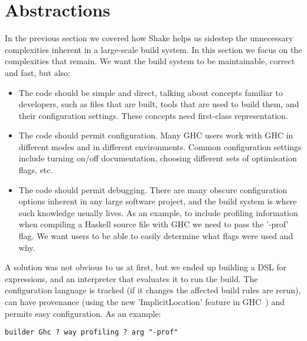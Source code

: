 \section{Abstractions\label{sec:abstractions}}


In the previous section we covered how Shake helps us sidestep the unnecessary
complexities inherent in a large-scale build system. In this section we focus on
the complexities that remain. We want the build system to be maintainable, correct
and fast, but also:

\begin{itemize}
\item The code should be simple and direct, talking about concepts familiar to
developers, such as files that are built, tools that are used to build
them, and their configuration settings. These concepts need first-class
representation.
\item The code should permit configuration. Many GHC users work with GHC in
different modes and in different environments. Common configuration settings
include turning on/off documentation, choosing different sets of optimisation flags,
etc.
\item The code should permit debugging. There are many obscure configuration
options inherent in any large software project, and the build system is where
such knowledge usually lives. As an example, to include profiling information
when compiling a Haskell source file with GHC we need to pass the \lst'-prof' flag.
We want users to be able to easily determine what flags were used and why.
\end{itemize}

A solution was not obvious to us at first, but we ended up building a DSL for
expressions, and an interpreter that evaluates it to run the build.
The configuration language is tracked (if it changes the affected build rules
are rerun), can have provenance (using the new \lst'ImplicitLocation' feature in
GHC~) and permits easy configuration. As an example:

\begin{lstlisting}
builder Ghc ? way profiling ? arg "-prof"
\end{lstlisting}

